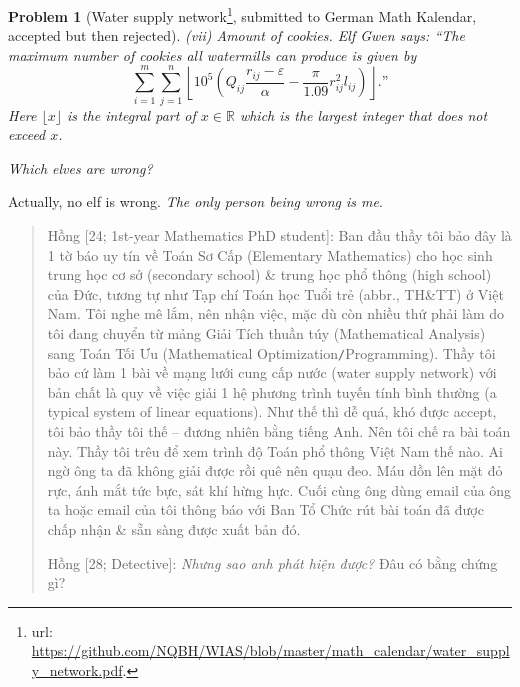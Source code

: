 \documentclass[12pt,twoside]{book}
\newtheorem{problem}{Problem}
\begin{document}
\begin{problem}[Water supply network\footnote{{\sc url}: \url{https://github.com/NQBH/WIAS/blob/master/math_calendar/water_supply_network.pdf}.}, submitted to German {\sc Math Kalendar}, accepted but then rejected]
	\item(vii) {\sf Amount of cookies.} Elf Gwen says: ``The maximum number of cookies all watermills can produce is given by
	\begin{equation*}
		\sum_{i = 1}^m\sum_{j = 1}^n \left\lfloor10^5\left(Q_{ij}\frac{r_{ij} - \varepsilon}{\alpha} - \frac{\pi}{1.09}r_{ij}^2l_{ij}\right)\right\rfloor.\mbox{''}
	\end{equation*}
	Here $\lfloor x\rfloor$ is the \emph{integral part} of $x\in\mathbb{R}$ which is the largest integer that does not exceed $x$.
	
	Which elves are wrong?
\end{problem}
Actually, no elf is wrong. {\it The only person being wrong is me}.

\begin{quote}
	{\sf Hồng [24; 1st-year Mathematics PhD student]}: Ban đầu thầy tôi bảo đây là 1 tờ báo uy tín về Toán Sơ Cấp (Elementary Mathematics) cho học sinh trung học cơ sở (secondary school) \& trung học phổ thông (high school) của Đức, tương tự như Tạp chí Toán học Tuổi trẻ (abbr., TH\&TT) ở Việt Nam. Tôi nghe mê lắm, nên nhận việc, mặc dù còn nhiều thứ phải làm do tôi đang chuyển từ mảng Giải Tích thuần túy (Mathematical Analysis) sang Toán Tối Ưu (Mathematical Optimization{\tt/}Programming). Thầy tôi bảo cứ làm 1 bài về mạng lưới cung cấp nước (water supply network) với bản chất là quy về việc giải 1 hệ phương trình tuyến tính bình thường (a typical system of linear equations). Như thế thì dễ quá, khó được accept, tôi bảo thầy tôi thế -- đương nhiên bằng tiếng Anh. Nên tôi chế ra bài toán này. Thầy tôi trêu để xem trình độ Toán phổ thông Việt Nam thế nào. Ai ngờ ông ta đã không giải được rồi quê nên quạu đeo. Máu dồn lên mặt đỏ rực, ánh mắt tức bực, sát khí hừng hực. Cuối cùng ông dùng email của ông ta hoặc email của tôi thông báo với Ban Tổ Chức rút bài toán đã được chấp nhận \& sẵn sàng được xuất bản đó.
	
	{\sf Hồng [28; Detective]}: {\it Nhưng sao anh phát hiện được?} Đâu có bằng chứng gì?
	

\end{quote}
\end{document}
